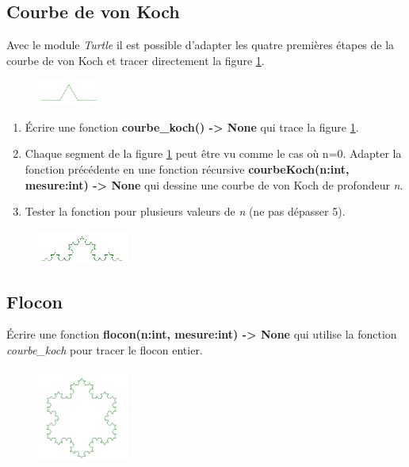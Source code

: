 \documentclass[a4paper,11pt]{article}
\begin{document}
\begin{Form}
\subsection{Courbe de von Koch}
Avec le module \emph{Turtle} il est possible d'adapter les quatre premières étapes de la courbe de von Koch et tracer directement la figure \ref{koch1}.
\begin{figure}[!h]
\centering
\includegraphics[width=2cm]{ressources/koch1.png}
\label{koch1}
\end{figure}
\begin{activite}
\begin{enumerate}
\item Écrire une fonction \textbf{courbe\_koch() -> None} qui trace la figure \ref{koch1}.
\item Chaque segment de la figure \ref{koch1} peut être vu comme le cas où n=0. Adapter la fonction précédente en une fonction récursive \textbf{courbeKoch(n:int, mesure:int) -> None} qui dessine une courbe de von Koch de profondeur \emph{n}.
\item Tester la fonction pour plusieurs valeurs de \emph{n}  (ne pas dépasser 5).
\end{enumerate}
\end{activite}
\begin{figure}[!h]
\centering
\includegraphics[width=3cm]{ressources/koch3.png}
\label{koch3}
\end{figure}
\subsection{Flocon}
\begin{activite}
Écrire une fonction \textbf{flocon(n:int, mesure:int) -> None} qui utilise la fonction \emph{courbe\_koch} pour tracer le flocon entier.
\end{activite}
\begin{figure}[!h]
\centering
\includegraphics[width=3cm]{ressources/flocon.png}
\label{flocon}
\end{figure}

\end{Form}
\end{document}
